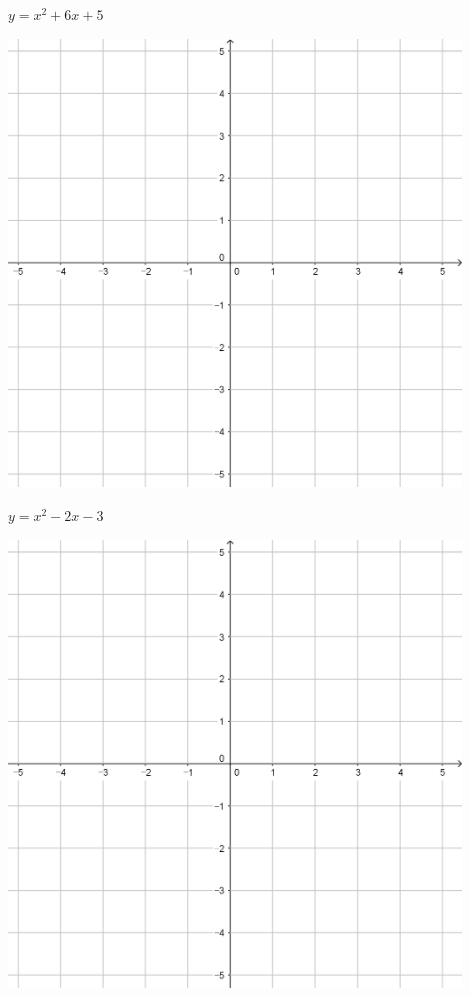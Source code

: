 \documentclass[a4paper]{oblivoir}
\begin{document}
\begin{minipage}{0.45\textwidth}\centering
\(y=x^2+6x+5\)
\par\bigskip\includegraphics[width=0.9\textwidth]{55}
\end{minipage}
\begin{minipage}{0.45\textwidth}\centering
\(y=x^2-2x-3\)
\par\bigskip\includegraphics[width=0.9\textwidth]{55}
\end{minipage}\bigskip\bigskip\par
\end{document}
